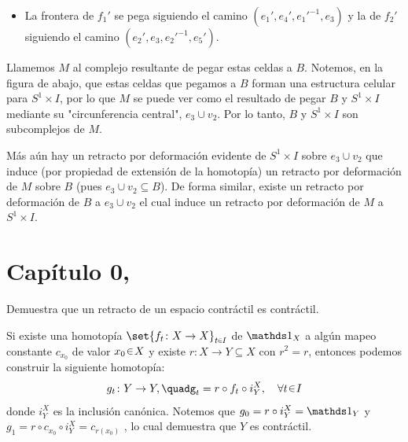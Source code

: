\begin{sol}
\begin{itemize}
\item La frontera de $f_1'$ se pega siguiendo el camino $(e_1', e_4',e_1'^{-1},e_3)$ y la de $f_2'$ siguiendo el camino $(e_2',e_3,e_2'^{-1},e_5')$.
\end{itemize}
Llamemos $M$ al complejo resultante de pegar estas celdas a $B$. Notemos, en la figura de abajo, que estas celdas que pegamos a $B$ forman una estructura celular para $S^1 \times I$, por lo que $M$ se puede ver como el resultado de pegar $B$ y $S^1 \times I$ mediante su "circunferencia central", $e_3 \cup v_2$. Por lo tanto, $B$ y $S^1 \times I$ son subcomplejos de $M$.

Más aún hay un retracto por deformación evidente de $S^1 \times I$ sobre $e_3 \cup v_2$ que induce (por propiedad de extensión de la homotopía) un retracto por deformación de $M$ sobre $B$ (pues $e_3 \cup v_2 \subseteq B$). De forma similar, existe un retracto por deformación de $B$ a $e_3 \cup v_2$ el cual induce un retracto por deformación de $M$ a $S^1 \times I$. 
\end{sol}

\section{Capítulo 0, \texorpdfstring{\cite{hatcher2002algebraic}}{Hatcher}}
\setcounter{eje}{8}
\begin{ejer}
Demuestra que un retracto de un espacio contráctil es contráctil.
\end{ejer}
\begin{sol}[Demostración]
Si existe una homotopía $\set{f_t \colon X \to X}_{t\en I}$ de $\id_X$ a algún mapeo constante $c_{x_0}$ de valor $x_0 \en X$ y existe $r \colon X \to Y \subseteq X$ con $r^2 = r$, entonces podemos construir la siguiente homotopía:
\[
g_t \colon Y \to Y,%
\quad%
g_t = r \circ f_t \circ i^X_Y,%
\quad\forall t\en I
\]
donde $i_Y^X$ es la inclusión canónica. Notemos que $g_0 = r \circ i_Y^X = \id_Y$ y $g_1 = r\circ c_{x_0} \circ i_Y^X = c_{r(x_0)}$
, lo cual demuestra que $Y$ es contráctil.
\end{sol}


